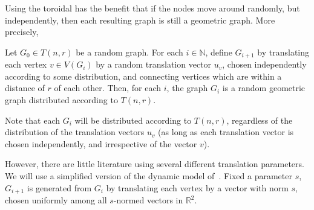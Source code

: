 Using the toroidal has the benefit that
if the nodes move around randomly, but independently,
then each resulting graph is still a geometric graph.
More precisely,

\begin{proposition}
	Let $G_0 \in T(n, r)$ be a random graph.
	For each $i \in \mathbb N$,
	define $G_{i+1}$ by translating each vertex $v \in V(G_i)$
	by a random translation vector $u_v$,
	chosen independently according to some distribution,
	and connecting vertices which are within a distance of $r$ of each other.
	Then, for each $i$,
	the graph $G_i$ is a random geometric graph distributed according to $T(n, r)$.
\end{proposition}

Note that each $G_i$ will be distributed according to $T(n, r)$,
regardless of the distribution of the translation vectors $u_v$
(as long as each translation vector is chosen independently,
and irrespective of the vector $v$).


However,
there are little literature using several different translation parameters.
We will use a simplified version of the dynamic model of~\cite{Diaz2008}.
Fixed a parameter $s$,
$G_{i+1}$ is generated from $G_i$
by translating each vertex by a vector with norm $s$,
chosen uniformly among all $s$-normed vectors in $\mathbb R^2$.

